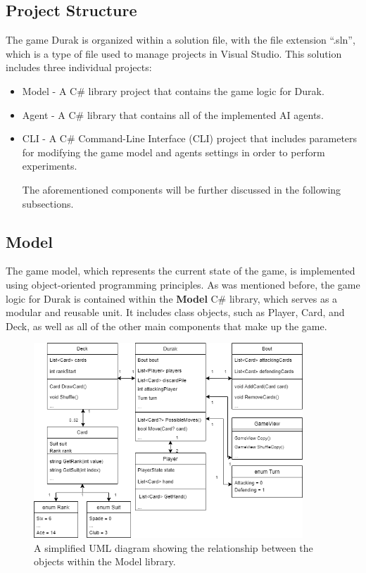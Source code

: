 \subsection{Project Structure}
The game Durak is organized within a solution file, with the file extension ``.sln'', which is a type of file used to manage projects in Visual Studio. This solution includes three individual projects: 

\begin{itemize}

\item Model - A C\# library project that contains the game logic for Durak.

\item Agent - A C\# library that contains all of the implemented AI agents.

\item CLI - A C\# Command-Line Interface (CLI) project that includes parameters for modifying the game model and agents settings in order to perform experiments.

The aforementioned components will be further discussed in the following subsections.

\end{itemize}

\subsection{Model}

The game model, which represents the current state of the game, is implemented using object-oriented programming principles. As was mentioned before, the game logic for Durak is contained within the \textbf{Model} C\# library, which serves as a modular and reusable unit. It includes class objects, such as Player, Card, and Deck, as well as all of the other main components that make up the game. 

\begin{figure}[h]
    \centering
    \captionsetup{justification=centering}
    \includegraphics[width=0.9\textwidth]{../img/modelUML.png}
    \caption{A simplified UML diagram showing the relationship between the objects within the Model library.}
    \label{fig:modelUML}
\end{figure}

